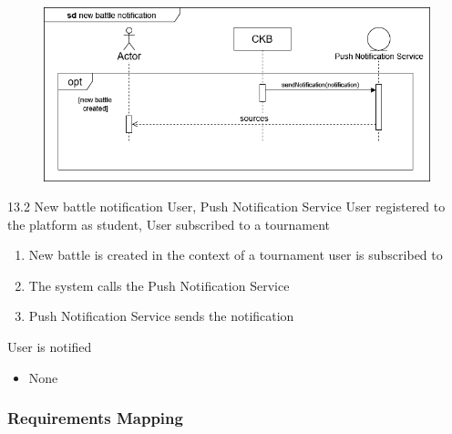 \usecase
{
    \begin{figure}[H]
        \centering
        \includegraphics[width=\textwidth]{src/sd_diagrams/pushbattle.png}
    \end{figure}
}
{13.2}
{New battle notification} %
{User, Push Notification Service} %
{User registered to the platform as student, User subscribed to a tournament} %
{ %
    \begin{enumerate}
        \item New battle is created in the context of a tournament user is subscribed to
        \item The system calls the Push Notification Service
        \item Push Notification Service sends the notification
    \end{enumerate}
}
{User is notified} %
{ %
    \begin{itemize}
        \item None
    \end{itemize}
}
{ %

}




\newpage

\subsubsection{Requirements Mapping}

\vspace{1cm}


